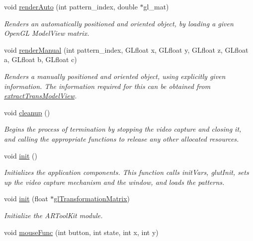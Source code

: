 \begin{DoxyCompactItemize}
void \hyperlink{namespacecg_1_1pi_1_1ar_a2a7b1d68ad09bf0baa75dc4e3339fc47}{render\-Auto} (int pattern\-\_\-index, double $\ast$gl\-\_\-mat)
\begin{DoxyCompactList}\small\item\em \-Renders an automatically positioned and oriented object, by loading a given \-Open\-G\-L \-Model\-View matrix. \end{DoxyCompactList}\item 
void \hyperlink{namespacecg_1_1pi_1_1ar_a601058fdb418bc8d7c95e64256cee4c3}{render\-Manual} (int pattern\-\_\-index, \-G\-Lfloat x, \-G\-Lfloat y, \-G\-Lfloat z, \-G\-Lfloat a, \-G\-Lfloat b, \-G\-Lfloat c)
\begin{DoxyCompactList}\small\item\em \-Renders a manually positioned and oriented object, using explicitly given information. \-The information required for this can be obtained from \hyperlink{namespacecg_1_1pi_1_1ar_a5b0f476cf646a6b0d26490f594f64a33}{extract\-Trans\-Model\-View}. \end{DoxyCompactList}\item 
void \hyperlink{namespacecg_1_1pi_1_1ar_afbeb3f02a1e14188f2318042f389b99b}{cleanup} ()
\begin{DoxyCompactList}\small\item\em \-Begins the process of termination by stopping the video capture and closing it, and calling the appropriate functions to release any other allocated resources. \end{DoxyCompactList}\item 
void \hyperlink{namespacecg_1_1pi_1_1ar_a1fca5521342384d779b14b37af9dd953}{init} ()
\begin{DoxyCompactList}\small\item\em \-Initializes the application components. \-This function calls init\-Vars, glut\-Init, sets up the video capture mechanism and the window, and loads the patterns. \end{DoxyCompactList}\item 
void \hyperlink{namespacecg_1_1pi_1_1ar_ab47f004cfde539ec2606fa3c7aba0593}{init} (float $\ast$\hyperlink{namespacecg_1_1pi_1_1ar_a3d6b78e9280aef07edbb62c471582713}{gl\-Transformation\-Matrix})
\begin{DoxyCompactList}\small\item\em \-Initialize the \-A\-R\-Tool\-Kit module. \end{DoxyCompactList}\item 
void \hyperlink{namespacecg_1_1pi_1_1ar_a4476b94368312636b0ac2be0ae742ce9}{mouse\-Func} (int button, int state, int x, int y)

\end{DoxyCompactItemize}
